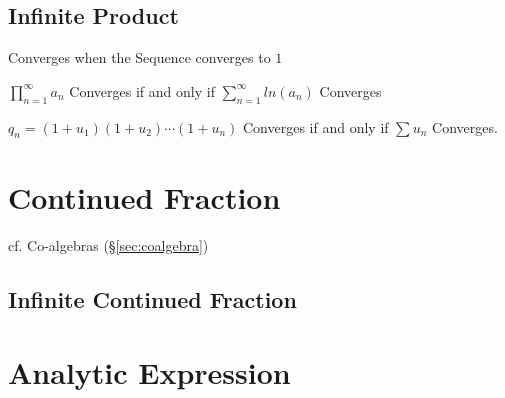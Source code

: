 \subsection{Infinite Product}\label{sec:infinite_product}

Converges when the Sequence converges to $1$

$\prod_{n=1}^\infty a_n$ Converges if and only if $\sum_{n=1}^\infty
ln(a_n)$ Converges

$q_n = (1 + u_1)(1 + u_2)\cdots(1 + u_n)$ Converges if and only if
$\sum u_n$ Converges.



\section{Continued Fraction}\label{sec:continued_fraction}

cf. Co-algebras (\S\ref{sec:coalgebra})



\subsection{Infinite Continued Fraction}\label{sec:infinite_continued_fraction}



\section{Analytic Expression}\label{sec:analytic_expression}

